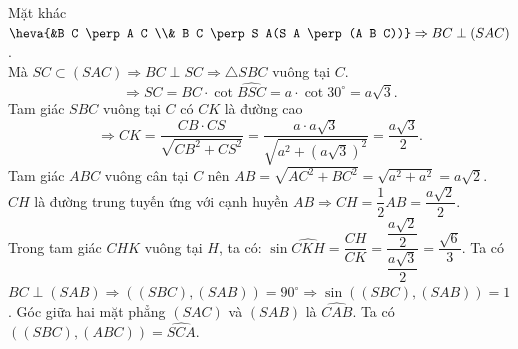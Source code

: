 \begin{ex}
{\begin{itemchoice}
			Mặt  khác
			$\heva{&B C \perp A C \\& B C \perp  S A(S A \perp(A B C))}\Rightarrow B C \perp(S A C)$.\\
			Mà $S C \subset(S A C) \Rightarrow B C \perp S  C \Rightarrow \triangle S B C$ vuông tại $C$.
			$$ 
			\Rightarrow S C=B C \cdot  \cot \widehat{B S C}=a \cdot \cot 30^{\circ}=a \sqrt{3}.
			 $$
			Tam giác $S B C$ vuông  tại $C$ có $C K$ là đường cao $$\Rightarrow C K=\dfrac{C B \cdot C S}{\sqrt{C B^2+C S^2}}=\dfrac{a \cdot a \sqrt{3}}{\sqrt{a^2+(a \sqrt{3})^2}}=\dfrac{a \sqrt{3}}{2}.$$
			Tam giác $A B C$ vuông cân tại $C$ nên $A B=\sqrt{A C^2+B C^2}=\sqrt{a^2+a^2}=a \sqrt{2}$.\\ 
			$C H$ là đường trung tuyến ứng với  cạnh huyền $A B \Rightarrow C H=\dfrac{1}{2} A B=\dfrac{a \sqrt{2}}{2}$.\\
			Trong tam giác $C H K$ vuông tại $H$, ta có: $\sin \widehat{C K H}=\dfrac{C H}{C K}=\dfrac{\dfrac{a \sqrt{2}}{2}}{\dfrac{a \sqrt{3}}{2}}=\dfrac{\sqrt{6}}{3}$. 
			\itemch Ta có $B C \perp(S A B) \Rightarrow((S B C),(S A B))=90^{\circ} \Rightarrow \sin ((S B C),(S A  B))=1$.
			\itemch Góc giữa hai mặt phẳng $(S A C)$ và $(S A B)$ là $\widehat{C A  B}$.
			\itemch Ta có  $((S B C),(A B C))=\widehat{S C A}$.
		\end{itemchoice}
	 }
\end{ex}

